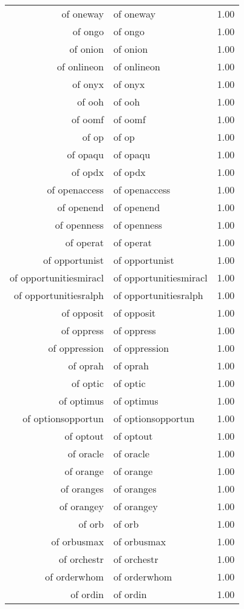 \begin{table}[ht]
\begin{tabular}{rlr}
  of oneway & of oneway & 1.00 \\ 
  of ongo & of ongo & 1.00 \\ 
  of onion & of onion & 1.00 \\ 
  of onlineon & of onlineon & 1.00 \\ 
  of onyx & of onyx & 1.00 \\ 
  of ooh & of ooh & 1.00 \\ 
  of oomf & of oomf & 1.00 \\ 
  of op & of op & 1.00 \\ 
  of opaqu & of opaqu & 1.00 \\ 
  of opdx & of opdx & 1.00 \\ 
  of openaccess & of openaccess & 1.00 \\ 
  of openend & of openend & 1.00 \\ 
  of openness & of openness & 1.00 \\ 
  of operat & of operat & 1.00 \\ 
  of opportunist & of opportunist & 1.00 \\ 
  of opportunitiesmiracl & of opportunitiesmiracl & 1.00 \\ 
  of opportunitiesralph & of opportunitiesralph & 1.00 \\ 
  of opposit & of opposit & 1.00 \\ 
  of oppress & of oppress & 1.00 \\ 
  of oppression & of oppression & 1.00 \\ 
  of oprah & of oprah & 1.00 \\ 
  of optic & of optic & 1.00 \\ 
  of optimus & of optimus & 1.00 \\ 
  of optionsopportun & of optionsopportun & 1.00 \\ 
  of optout & of optout & 1.00 \\ 
  of oracle & of oracle & 1.00 \\ 
  of orange & of orange & 1.00 \\ 
  of oranges & of oranges & 1.00 \\ 
  of orangey & of orangey & 1.00 \\ 
  of orb & of orb & 1.00 \\ 
  of orbusmax & of orbusmax & 1.00 \\ 
  of orchestr & of orchestr & 1.00 \\ 
  of orderwhom & of orderwhom & 1.00 \\ 
  of ordin & of ordin & 1.00 \\ 

\end{tabular}
\end{table}
